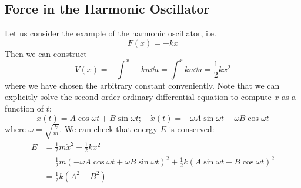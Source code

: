 \documentclass{article}
\begin{document}
\subsection{Force in the Harmonic Oscillator}
Let us consider the example of the harmonic oscillator, i.e.
\[ F(x) = -kx \]
Then we can construct
\[ V(x) = -\int^x -ku \dd{u} = \int^x ku \dd{u} = \frac{1}{2} kx^2 \]
where we have chosen the arbitrary constant conveniently. Note that we can explicitly solve the second order ordinary differential equation to compute $x$ as a function of $t$:
\[ x(t) = A\cos \omega t + B\sin \omega t;\quad \dot x(t) = -\omega A \sin \omega t + \omega B \cos \omega t \]
where $\omega = \sqrt{\frac{k}{m}}$. We can check that energy $E$ is conserved:
\begin{align*}
    E & = \frac{1}{2}m\dot x^2 + \frac{1}{2}kx^2                                                                                                         \\
      & = \frac{1}{2}m \left( -\omega A \cos \omega t + \omega B \sin \omega t \right)^2 + \frac{1}{2}k \left( A\sin \omega t + B\cos \omega t \right)^2 \\
      & = \frac{1}{2}k(A^2 + B^2)
\end{align*}
\end{document}
